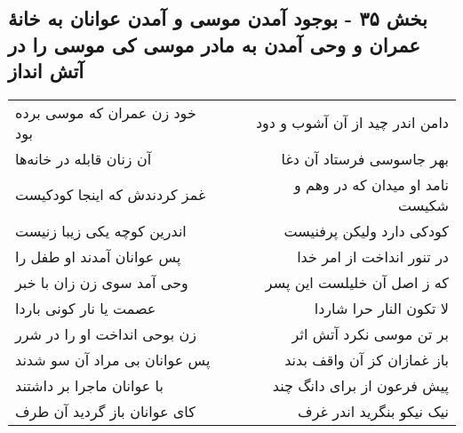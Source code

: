 \begin{center}
\section*{بخش ۳۵ - بوجود آمدن موسی و آمدن عوانان به خانهٔ  عمران و وحی آمدن به مادر موسی کی موسی را در آتش انداز}
\label{sec:sh035}
\begin{longtable}{l p{0.5cm} r}
خود زن عمران که موسی برده بود
&&
دامن اندر چید از آن آشوب و دود
\\
آن زنان قابله در خانه‌ها
&&
بهر جاسوسی فرستاد آن دغا
\\
غمز کردندش که اینجا کودکیست
&&
نامد او میدان که در وهم و شکیست
\\
اندرین کوچه یکی زیبا زنیست
&&
کودکی دارد ولیکن پرفنیست
\\
پس عوانان آمدند او طفل را
&&
در تنور انداخت از امر خدا
\\
وحی آمد سوی زن زان با خبر
&&
که ز اصل آن خلیلست این پسر
\\
عصمت یا نار کونی باردا
&&
لا تکون النار حرا شاردا
\\
زن بوحی انداخت او را در شرر
&&
بر تن موسی نکرد آتش اثر
\\
پس عوانان بی مراد آن سو شدند
&&
باز غمازان کز آن واقف بدند
\\
با عوانان ماجرا بر داشتند
&&
پیش فرعون از برای دانگ چند
\\
کای عوانان باز گردید آن طرف
&&
نیک نیکو بنگرید اندر غرف
\\
\end{longtable}
\end{center}
